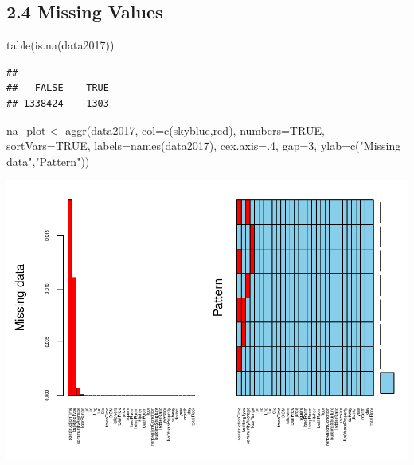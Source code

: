 \documentclass[
]{article}
\newenvironment{Shaded}{\begin{snugshade}}{\end{snugshade}}
\newcommand{\AttributeTok}[1]{\textcolor[rgb]{0.77,0.63,0.00}{#1}}
\newcommand{\ConstantTok}[1]{\textcolor[rgb]{0.00,0.00,0.00}{#1}}
\newcommand{\DecValTok}[1]{\textcolor[rgb]{0.00,0.00,0.81}{#1}}
\newcommand{\FunctionTok}[1]{\textcolor[rgb]{0.00,0.00,0.00}{#1}}
\newcommand{\NormalTok}[1]{#1}
\newcommand{\OtherTok}[1]{\textcolor[rgb]{0.56,0.35,0.01}{#1}}
\newcommand{\StringTok}[1]{\textcolor[rgb]{0.31,0.60,0.02}{#1}}
\begin{document}
\hypertarget{missing-values}{%
\subsection{2.4 Missing Values}\label{missing-values}}

\begin{Shaded}
\begin{Highlighting}[]
\FunctionTok{table}\NormalTok{(}\FunctionTok{is.na}\NormalTok{(data2017))}
\end{Highlighting}
\end{Shaded}

\begin{verbatim}
## 
##   FALSE    TRUE 
## 1338424    1303
\end{verbatim}

\begin{Shaded}
\begin{Highlighting}[]
\NormalTok{na\_plot }\OtherTok{\textless{}{-}} \FunctionTok{aggr}\NormalTok{(data2017, }\AttributeTok{col=}\FunctionTok{c}\NormalTok{(}\StringTok{\textquotesingle{}skyblue\textquotesingle{}}\NormalTok{,}\StringTok{\textquotesingle{}red\textquotesingle{}}\NormalTok{), }\AttributeTok{numbers=}\ConstantTok{TRUE}\NormalTok{, }\AttributeTok{sortVars=}\ConstantTok{TRUE}\NormalTok{, }
                \AttributeTok{labels=}\FunctionTok{names}\NormalTok{(data2017), }\AttributeTok{cex.axis=}\NormalTok{.}\DecValTok{4}\NormalTok{, }\AttributeTok{gap=}\DecValTok{3}\NormalTok{, }\AttributeTok{ylab=}\FunctionTok{c}\NormalTok{(}\StringTok{"Missing data"}\NormalTok{,}\StringTok{"Pattern"}\NormalTok{))}
\end{Highlighting}
\end{Shaded}

\includegraphics{Project_files/figure-latex/unnamed-chunk-6-1.pdf}
\end{document}

